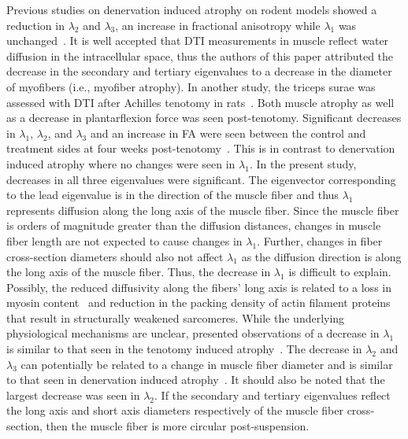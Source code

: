 Previous studies on denervation induced atrophy on rodent models showed a reduction in $\lambda_2$ and $\lambda_3$, an increase in fractional anisotropy while $\lambda_1$ was unchanged~\cite{RND8}. 
It is well accepted that DTI measurements in muscle reflect water diffusion in the intracellular space, thus the authors of this paper attributed the decrease in the secondary and tertiary eigenvalues to a decrease in the diameter of myofibers (i.e., myofiber atrophy). 
In another study, the triceps surae was assessed with DTI after Achilles tenotomy in rats~\cite{RND9}. 
Both muscle atrophy as well as a decrease in plantarflexion force was seen post-tenotomy. 
Significant decreases in $\lambda_1$, $\lambda_2$, and $\lambda_3$ and an increase in FA were seen between the control and treatment sides at four weeks post-tenotomy~\cite{RND9}. 
This is in contrast to denervation induced atrophy where no changes were seen in $\lambda_1$.
In the present study, decreases in all three eigenvalues were significant. 
The eigenvector corresponding to the lead eigenvalue is in the direction of the muscle fiber and thus $\lambda_1$ represents diffusion along the long axis of the muscle fiber. 
Since the muscle fiber is orders of magnitude greater than the diffusion distances, changes in muscle fiber length are not expected to cause changes in $\lambda_1$. 
Further, changes in fiber cross-section diameters should also not affect $\lambda_1$ as the diffusion direction is along the long axis of the muscle fiber. 
Thus, the decrease in $\lambda_1$ is difficult to explain. 
Possibly, the reduced diffusivity along the fibers' long axis is related to a loss in myosin content~\cite{RNS10} and reduction in the packing density of actin filament proteins~\cite{RND35} that result in structurally weakened sarcomeres. 
While the underlying physiological mechanisms are unclear, presented observations of a decrease in $\lambda_1$ is similar to that seen in the tenotomy induced atrophy~\cite{RND9}.
The decrease in $\lambda_2$ and $\lambda_3$ can potentially be related to a change in muscle fiber diameter and is similar to that seen in denervation induced atrophy~\cite{RND8}. 
It should also be noted that the largest decrease was seen in $\lambda_2$. 
If the secondary and tertiary eigenvalues reflect the long axis and short axis diameters respectively of the muscle fiber cross-section, then the muscle fiber is more circular post-suspension. 

